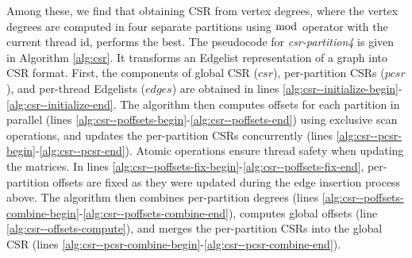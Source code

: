Among these, we find that obtaining CSR from vertex degrees, where the vertex degrees are computed in four separate partitions using $\bmod$ operator with the current thread id, performs the best. The pseudocode for \textit{csr-partition4} is given in Algorithm \ref{alg:csr}. It transforms an Edgelist representation of a graph into CSR format. First, the components of global CSR ($csr$), per-partition CSRs ($pcsr$), and per-thread Edgelists ($edges$) are obtained in lines \ref{alg:csr--initialize-begin}-\ref{alg:csr--initialize-end}. The algorithm then computes offsets for each partition in parallel (lines \ref{alg:csr--poffsets-begin}-\ref{alg:csr--poffsets-end}) using exclusive scan operations, and updates the per-partition CSRs concurrently (lines \ref{alg:csr--pcsr-begin}-\ref{alg:csr--pcsr-end}). Atomic operations ensure thread safety when updating the matrices. In lines \ref{alg:csr--poffsets-fix-begin}-\ref{alg:csr--poffsets-fix-end}, per-partition offsets are fixed as they were updated during the edge insertion process above. The algorithm then combines per-partition degrees (lines \ref{alg:csr--poffsets-combine-begin}-\ref{alg:csr--poffsets-combine-end}), computes global offsets (line \ref{alg:csr--offsets-compute}), and merges the per-partition CSRs into the global CSR (lines \ref{alg:csr--pcsr-combine-begin}-\ref{alg:csr--pcsr-combine-end}).


